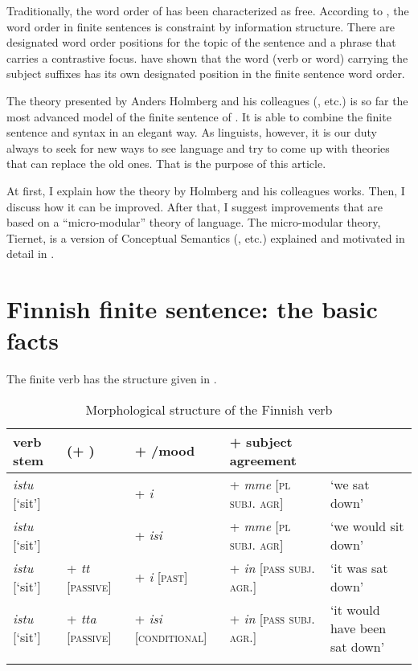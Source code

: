 \documentclass[output=paper]{langsci/langscibook}
\begin{document}
Traditionally, the word order of  has been characterized as free.  According to \citet{Vilkuna1989}, the word order in  finite sentences is constraint by information structure. There are designated word order positions for the topic of the sentence and a phrase that carries a contrastive focus.  \citet{HolmbergNikanne1994,HolmbergNikanne2002,HolmbergNikanne2008} have shown that the word (verb or  word) carrying the subject  suffixes has its own designated position in the finite sentence word order.  

The theory presented by Anders Holmberg and his colleagues (\citealt{HolmbergEtAl1993,HolmbergNikanne2002}, etc.) is so far the most advanced model of the finite sentence of . It is able to combine the  finite sentence  and syntax in an elegant way.  As linguists, however, it is our duty always to seek for new ways to see language and try to come up with theories that can replace the old ones. That is the purpose of this article. 

At first, I explain how the theory by Holmberg and his colleagues works. Then, I discuss how it can be improved. After that, I suggest improvements that are based on a “micro-modular” theory of language. The micro-modular theory, Tiernet, is a version of Conceptual Semantics (\citealt{Jackendoff1983,Jackendoff1990,Jackendoff2002}, etc.) explained and motivated in detail in \citet{Nikannefc}.

\section{Finnish finite sentence: the basic facts}%

The  finite verb has the  structure given in .

\begin{table}
\caption{Morphological structure of the Finnish verb}
\label{ex:nikanne:1}
\small
\begin{tabularx}{\textwidth}{llllQ}
\lsptoprule
{verb stem}  & {(+ )} & {+ /mood}  & {+ subject agreement} & \\\midrule
\textit{istu} [‘sit’] &  & + \textit{i} & + \textit{mme} [{\scshape{}pl subj. agr}] & ‘we sat down’\\
\textit{istu} [‘sit’] &  & + \textit{isi} & + \textit{mme} [{\scshape{}pl subj. agr}] & ‘we would sit down'\\
\textit{istu}  [‘sit’] & + \textit{tt}  [{\scshape passive}] & + \textit{i} [{\scshape past}] & + \textit{in} [{\scshape pass subj. agr.}] & ‘it was sat down’\\
\textit{istu} [‘sit’] & + \textit{tta} [{\scshape passive}] & + \textit{isi} [{\scshape conditional}] & + \textit{in} [{\scshape pass subj. agr.}] & ‘it would have been sat down’\\
\lspbottomrule
\end{tabularx}
\end{table}%
\end{document}
